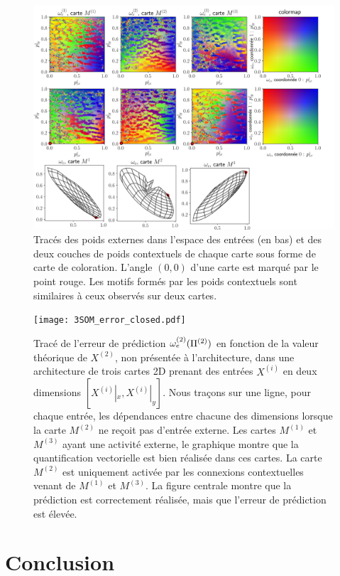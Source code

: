 \documentclass[../main]{subfiles}
\begin{document}
\begin{figure}
		\includegraphics[width=\textwidth]{3SOM_S_wc_239999.png}
		\caption{Tracés des poids externes dans l'espace des entrées (en bas) et des deux couches de poids contextuels de chaque carte sous forme de carte de coloration. L'angle $(0,0)$ d'une carte est marqué par le point rouge. Les motifs formés par les poids contextuels sont similaires à ceux observés sur deux cartes. \label{fig:3som_w}}
\end{figure}

\begin{figure}
\centering\texttt{[image: 3SOM\_error\_closed.pdf]}
\caption{Tracé de l'erreur de prédiction $\omega_e^{({2})}(\Pi^{({2})})$ en fonction de la valeur théorique de $X^{(2)}$, non présentée à l'architecture, dans une architecture de trois cartes 2D prenant des entrées $X^{(i)}$ en deux dimensions $[X^{(i)}|_x, X^{(i)}|_y]$. Nous traçons sur une ligne, pour chaque entrée, les dépendances entre chacune des dimensions
lorsque la carte $M^{(2)}$ ne reçoit pas d'entrée externe. Les cartes $M^{(1)}$ et $M^{(3)}$ ayant une activité externe, le graphique montre que la quantification vectorielle est bien réalisée dans ces cartes. La carte $M^{(2)}$ est uniquement activée par les connexions contextuelles venant de $M^{(1)}$ et $M^{(3)}$. La figure centrale montre que la prédiction est correctement réalisée, mais que l'erreur de prédiction est élevée. \label{fig:3som_pred}}
\end{figure}


\section{Conclusion}
\end{document}
